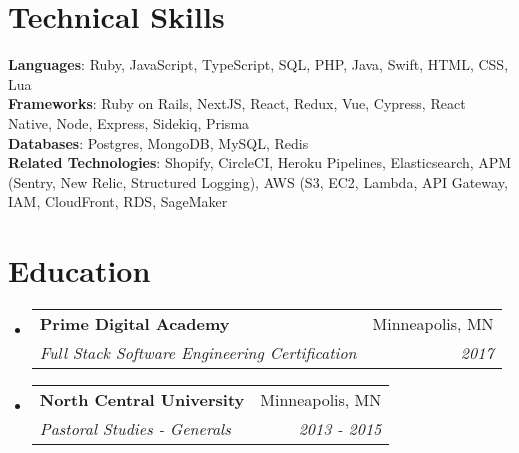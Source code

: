 \documentclass[letterpaper,11pt]{article}
\makeatletter
\newcommand{\resumeSubheading}[4]{
  \vspace{-2pt}\item
    \begin{tabular*}{0.97\textwidth}[t]{l@{\extracolsep{\fill}}r}
      \textbf{#1} & #2 \\
      \textit{\small#3} & \textit{\small #4} \\
    \end{tabular*}\vspace{-7pt}
}
\newcommand{\resumeSubHeadingListStart}{\begin{itemize}[leftmargin=0.15in, label={}]}
\newcommand{\resumeSubHeadingListEnd}{\end{itemize}}
\makeatother
\begin{document}
\section{Technical Skills}
 \begin{itemize}[leftmargin=0.15in, label={}]
    \small{\item{
     \textbf{Languages}{: Ruby, JavaScript, TypeScript, SQL, PHP, Java, Swift, HTML, CSS, Lua} \\
     \textbf{Frameworks}{: Ruby on Rails, NextJS, React, Redux, Vue, Cypress, React Native, Node, Express, Sidekiq, Prisma} \\
     \textbf{Databases}{: Postgres, MongoDB, MySQL, Redis} \\
     \textbf{Related Technologies}{: Shopify, CircleCI, Heroku Pipelines, Elasticsearch, APM (Sentry, New Relic, Structured Logging), AWS (S3, EC2, Lambda, API Gateway, IAM, CloudFront, RDS, SageMaker}
    }}
 \end{itemize}


\section{Education}
  \resumeSubHeadingListStart
    \resumeSubheading
      {Prime Digital Academy}{Minneapolis, MN}
      {Full Stack Software Engineering Certification}{2017}
    \resumeSubheading
      {North Central University}{Minneapolis, MN}
      {Pastoral Studies - Generals}{2013 - 2015}
  \resumeSubHeadingListEnd


\end{document}

